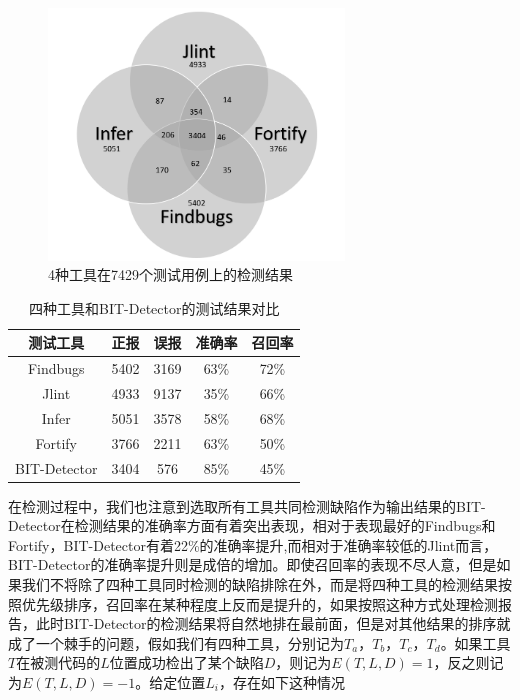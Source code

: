 \begin{figure}
	\centering
	\includegraphics[width=0.70\textwidth]{figures/vnfigure3-1}
	\caption{4种工具在7429个测试用例上的检测结果}\label{fig:figure3-1}
\end{figure}

\begin{table}
	\centering
	\caption{四种工具和BIT-Detector的测试结果对比} \label{tab:table3-1}
	\begin{tabular*}{0.9\textwidth}{@{\extracolsep{\fill}}ccccc}
		\toprule
		测试工具	&正报	&误报	&准确率	&召回率 \\
		\midrule
		Findbugs	&5402	&3169	&63\%	&72\% \\
		Jlint	&4933	&9137	&35\%	&66\% \\
		Infer	&5051	&3578	&58\%	&68\% \\
		Fortify	&3766	&2211	&63\%	&50\% \\
		BIT-Detector	&3404	&576	&85\%	&45\% \\
		\bottomrule
	\end{tabular*}
\end{table}

在检测过程中，我们也注意到选取所有工具共同检测缺陷作为输出结果的BIT-Detector在检测结果的准确率方面有着突出表现，相对于表现最好的Findbugs和Fortify，BIT-Detector有着22\%的准确率提升,而相对于准确率较低的Jlint而言，BIT-Detector的准确率提升则是成倍的增加。即使召回率的表现不尽人意，但是如果我们不将除了四种工具同时检测的缺陷排除在外，而是将四种工具的检测结果按照优先级排序，召回率在某种程度上反而是提升的，如果按照这种方式处理检测报告，此时BIT-Detector的检测结果将自然地排在最前面，但是对其他结果的排序就成了一个棘手的问题，假如我们有四种工具，分别记为$T_a$，$T_b$，$T_c$，$T_d$。如果工具$T$在被测代码的$L$位置成功检出了某个缺陷$D$，则记为$E(T,L,D)=1$，反之则记为$E(T,L,D)=-1$。给定位置$L_i$，存在如下这种情况

